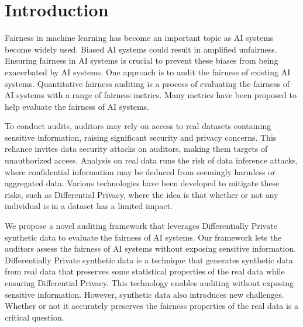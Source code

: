 \documentclass[manuscript,screen,review,anonymous]{acmart}
\begin{document}


\maketitle

\section{Introduction}

Fairness in machine learning has become an important topic as AI systems become widely used. Biased AI systems could result in amplified unfairness. Ensuring fairness in AI systems is crucial to prevent these biases from being exacerbated by AI systems. One approach is to audit the fairness of existing AI systems. Quantitative fairness auditing is a process of evaluating the fairness of AI systems with a range of fairness metrics. Many metrics have been proposed to help evaluate the fairness of AI systems.


To conduct audits, auditors may rely on access to real datasets containing sensitive information, raising significant security and privacy concerns. This reliance invites data security attacks on auditors, making them targets of unauthorized access. Analysis on real data runs the risk of data inference attacks, where confidential information may be deduced from seemingly harmless or aggregated data. Various technologies have been developed to mitigate these risks, such as Differential Privacy, where the idea is that whether or not any individual is in a dataset has a limited impact.


We propose a novel auditing framework that leverages Differentially Private synthetic data to evaluate the fairness of AI systems. Our framework lets the auditors assess the fairness of AI systems without exposing sensitive information. Differentially Private synthetic data is a technique that generates synthetic data from real data that preserves some statistical properties of the real data while ensuring Differential Privacy. This technology enables auditing without exposing sensitive information. However, synthetic data also introduces new challenges. Whether or not it accurately preserves the fairness properties of the real data is a critical question.
\end{document}
